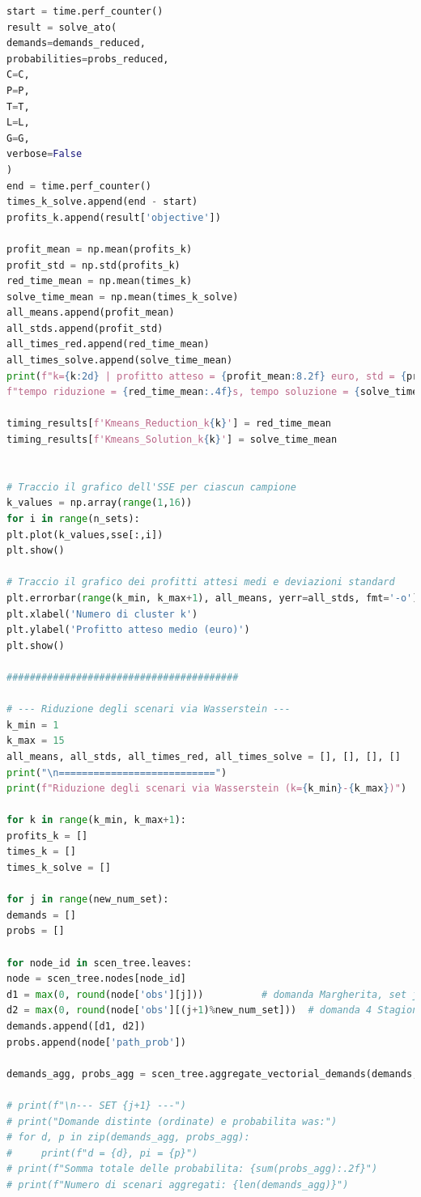 \documentclass[a4paper,12pt]{article}
\begin{document}
\begin{lstlisting}[language=python,caption={Main of ATO problem},label={lst:main-ato}]
start = time.perf_counter()
result = solve_ato(
demands=demands_reduced,
probabilities=probs_reduced,
C=C,
P=P,
T=T,
L=L,
G=G,
verbose=False
)
end = time.perf_counter()
times_k_solve.append(end - start)
profits_k.append(result['objective'])

profit_mean = np.mean(profits_k)
profit_std = np.std(profits_k)    
red_time_mean = np.mean(times_k)
solve_time_mean = np.mean(times_k_solve)
all_means.append(profit_mean)
all_stds.append(profit_std)
all_times_red.append(red_time_mean)
all_times_solve.append(solve_time_mean)
print(f"k={k:2d} | profitto atteso = {profit_mean:8.2f} euro, std = {profit_std:6.2f} euro, "
f"tempo riduzione = {red_time_mean:.4f}s, tempo soluzione = {solve_time_mean:.4f}s")

timing_results[f'Kmeans_Reduction_k{k}'] = red_time_mean
timing_results[f'Kmeans_Solution_k{k}'] = solve_time_mean


# Traccio il grafico dell'SSE per ciascun campione
k_values = np.array(range(1,16))
for i in range(n_sets):
plt.plot(k_values,sse[:,i])
plt.show()

# Traccio il grafico dei profitti attesi medi e deviazioni standard
plt.errorbar(range(k_min, k_max+1), all_means, yerr=all_stds, fmt='-o')
plt.xlabel('Numero di cluster k')
plt.ylabel('Profitto atteso medio (euro)')
plt.show()

########################################

# --- Riduzione degli scenari via Wasserstein ---
k_min = 1
k_max = 15
all_means, all_stds, all_times_red, all_times_solve = [], [], [], []
print("\n===========================")
print(f"Riduzione degli scenari via Wasserstein (k={k_min}-{k_max})")

for k in range(k_min, k_max+1):
profits_k = []
times_k = []
times_k_solve = []

for j in range(new_num_set):
demands = []
probs = []

for node_id in scen_tree.leaves:
node = scen_tree.nodes[node_id]
d1 = max(0, round(node['obs'][j]))          # domanda Margherita, set j
d2 = max(0, round(node['obs'][(j+1)%new_num_set]))  # domanda 4 Stagioni
demands.append([d1, d2])
probs.append(node['path_prob'])

demands_agg, probs_agg = scen_tree.aggregate_vectorial_demands(demands, probs)

# print(f"\n--- SET {j+1} ---")
# print("Domande distinte (ordinate) e probabilita was:")
# for d, p in zip(demands_agg, probs_agg):
#     print(f"d = {d}, pi = {p}")
# print(f"Somma totale delle probabilita: {sum(probs_agg):.2f}")
# print(f"Numero di scenari aggregati: {len(demands_agg)}")


\end{lstlisting}
\end{document}
